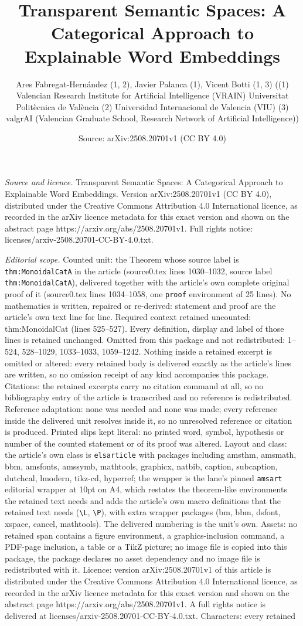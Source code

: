 \documentclass[10pt,a4paper]{amsart}
\title[Transparent Semantic Spaces: A Categorical Approach to Expla]{Transparent Semantic Spaces: A Categorical Approach to Explainable Word Embeddings}
\author{Ares Fabregat-Hern\'andez (1, 2), Javier Palanca (1), Vicent Botti (1, 3) ((1) Valencian Research Institute for Artificial Intelligence (VRAIN) Universitat Polit\`ecnica de Val\`encia (2) Universidad Internacional de Valencia (VIU) (3) valgrAI (Valencian Graduate School, Research Network of Artificial Intelligence))}
\date{Source: arXiv:2508.20701v1 (CC BY 4.0)}
\begin{document}
\maketitle

\noindent\emph{Source and licence.} Transparent Semantic Spaces: A Categorical Approach to Explainable Word Embeddings. Version arXiv:2508.20701v1 (CC BY 4.0), distributed under the Creative Commons Attribution 4.0 International licence, as recorded in the arXiv licence metadata for this exact version and shown on the abstract page https://arxiv.org/abs/2508.20701v1. Full rights notice: licenses/arxiv-2508.20701-CC-BY-4.0.txt.\par\smallskip

\noindent\textit{Editorial scope.} Counted unit: the Theorem whose source label is \texttt{thm:MonoidalCatA} in the article (source0.tex lines 1030--1032, source label \texttt{thm:MonoidalCatA}), delivered together with the article's own complete original proof of it (source0.tex lines 1034--1058, one \texttt{proof} environment of 25 lines). No mathematics is written, repaired or re-derived: statement and proof are the article's own text line for line. Required context retained uncounted: thm:MonoidalCat (lines 525--527). Every definition, display and label of those lines is retained unchanged. Omitted from this package and not redistributed: 1--524, 528--1029, 1033--1033, 1059--1242. Nothing inside a retained excerpt is omitted or altered: every retained body is delivered exactly as the article's lines are written, so no omission receipt of any kind accompanies this package. Citations: the retained excerpts carry no citation command at all, so no bibliography entry of the article is transcribed and no reference is redistributed. Reference adaptation: none was needed and none was made; every reference inside the delivered unit resolves inside it, so no unresolved reference or citation is produced. Printed slips kept literal: no printed word, symbol, hypothesis or number of the counted statement or of its proof was altered. Layout and class: the article's own class is \texttt{elsarticle} with packages including amsthm, amsmath, bbm, amsfonts, amssymb, mathtools, graphicx, natbib, caption, subcaption, dutchcal, lmodern, tikz-cd, hyperref; the wrapper is the lane's pinned \texttt{amsart} editorial wrapper at 10pt on A4, which restates the theorem-like environments the retained text needs and adds the article's own macro definitions that the retained text needs (\texttt{\textbackslash L}, \texttt{\textbackslash P}), with extra wrapper packages (bm, bbm, dsfont, xspace, cancel, mathtools). The delivered numbering is the unit's own. Assets: no retained span contains a figure environment, a graphics-inclusion command, a PDF-page inclusion, a table or a TikZ picture; no image file is copied into this package, the package declares no asset dependency and no image file is redistributed with it. Licence: version arXiv:2508.20701v1 of this article is distributed under the Creative Commons Attribution 4.0 International licence, as recorded in the arXiv licence metadata for this exact version and shown on the abstract page https://arxiv.org/abs/2508.20701v1. A full rights notice is delivered at licenses/arxiv-2508.20701-CC-BY-4.0.txt. Characters: every retained 
\end{document}
